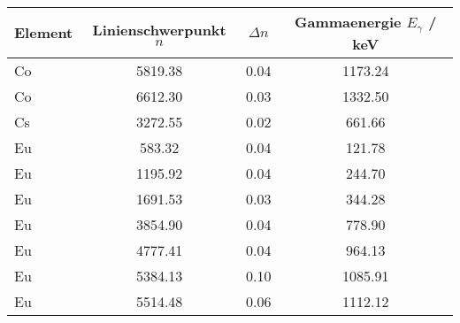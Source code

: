 \begin{tabular}{lSSS}
\toprule
Element & {Linienschwerpunkt $n$} & {$\Delta n$} & {Gammaenergie $E_{\gamma}$} / \si{\kilo\electronvolt} \\ \midrule
Co & 5819.38 & 0.04 & 1173.24 \\
Co & 6612.30 & 0.03 & 1332.50 \\
Cs & 3272.55 & 0.02 & 661.66  \\
Eu & 583.32  & 0.04 & 121.78  \\
Eu & 1195.92 & 0.04 & 244.70  \\
Eu & 1691.53 & 0.03 & 344.28  \\
Eu & 3854.90 & 0.04 & 778.90  \\
Eu & 4777.41 & 0.04 & 964.13  \\
Eu & 5384.13 & 0.10 & 1085.91 \\
Eu & 5514.48 & 0.06 & 1112.12 \\ \bottomrule
\end{tabular}